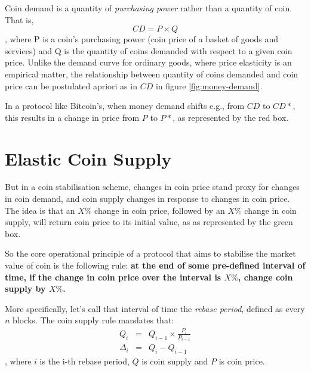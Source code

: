 \documentclass[twocolumn]{article}
\begin{document}
Coin demand is a quantity of \emph{purchasing power} rather than a
quantity of coin. That is,
\begin{equation}
CD = P\times Q
\end{equation}
, where P is a coin's purchasing power (coin price of a basket of
goods and services) and Q is the quantity of coins demanded with
respect to a given coin price. Unlike the demand curve for ordinary
goods, where price elasticity is an empirical matter, the relationship
between quantity of coins demanded and coin price can be postulated
apriori as in $CD$ in figure \ref{fig:money-demand}. 

In a protocol like Bitcoin's, when money demand shifts e.g., from $CD$
to $CD*$, this results in a change in price from $P$ to $P*$, as
represented by the red box.

\section*{Elastic Coin Supply}
But in a coin stabilisation scheme, changes in coin price stand proxy
for changes in coin demand, and coin supply changes in response to
changes in coin price. The idea is that an $X\%$ change in coin price,
followed by an $X\%$ change in coin supply, will return coin price to
its initial value, as as represented by the green box.

So the core operational principle of a protocol that aims to stabilise
the market value of coin is the following rule: \textbf{at the end of
  some pre-defined interval of time, if the change in coin price over
  the interval is $X\%$, change coin supply by $X\%$.}

More specifically, let's call that interval of time the \emph{rebase
  period}, defined as every $n$ blocks. The coin supply rule mandates
that:
\begin{eqnarray}
Q_{i} &=& Q_{i-1}\times \frac{P_{i}}{P_{i-1}}\label{eqn:supply}\\
\Delta_{i} &=& Q_{i} - Q_{i-1}\label{eqn:delta}
\end{eqnarray},
where $i$ is the i-th rebase period, $Q$ is coin supply and $P$ is
coin price. 
\end{document}

